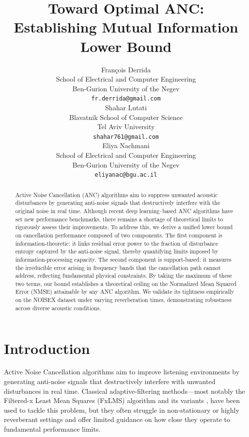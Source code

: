 \documentclass{article}
\title{Toward Optimal ANC: Establishing Mutual Information Lower Bound}
\author{%
  François Derrida \\
  School of Electrical and Computer Engineering \\
  Ben-Gurion University of the Negev \\
  \texttt{fr.derrida@gmail.com} \\
  \And
  Shahar Lutati \\
  Blavatnik School of Computer Science \\
  Tel Aviv University \\
  \texttt{shahar761@gmail.com} \\
  \And
  Eliya Nachmani \\
  School of Electrical and Computer Engineering \\
  Ben-Gurion University of the Negev \\
  \texttt{eliyanac@bgu.ac.il} \\
}
\begin{document}
\maketitle



\maketitle


\begin{abstract}
Active Noise Cancellation (ANC) algorithms aim to suppress unwanted acoustic disturbances by generating anti-noise signals that destructively interfere with the original noise in real time. Although recent deep learning–based ANC algorithms have set new performance benchmarks, there remains a shortage of theoretical limits to rigorously assess their improvements.
To address this, we derive a unified lower bound on cancellation performance composed of two components. The first component is information-theoretic: it links residual error power to the fraction of disturbance entropy captured by the anti-noise signal, thereby quantifying limits imposed by information-processing capacity. The second component is support-based: it measures the irreducible error arising in frequency bands that the cancellation path cannot address, reflecting fundamental physical constraints. By taking the maximum of these two terms, our bound establishes a theoretical ceiling on the Normalized Mean Squared Error (NMSE) attainable by any ANC algorithm. We validate its tightness empirically on the NOISEX dataset under varying reverberation times, demonstrating robustness across diverse acoustic conditions.
\end{abstract}


\section{Introduction}

Active Noise Cancellation algorithms \cite{lueg1936process, nelson1991active, fuller1996active, hansen1997active,kuo1999active} aim to improve listening environments by generating anti-noise signals that destructively interfere with unwanted disturbances in real time. Classical adaptive-filtering methods—most notably the Filtered-x Least Mean Squares (FxLMS) algorithm \cite{boucher1991effect} and its variants \cite{das2004active, patra1999identification, tan2001adaptive, kuo2005nonlinear, tobias2005leaky}, have been used to tackle this problem, but they often struggle in non-stationary or highly reverberant settings and offer limited guidance on how close they operate to fundamental performance limits.
\end{document}
